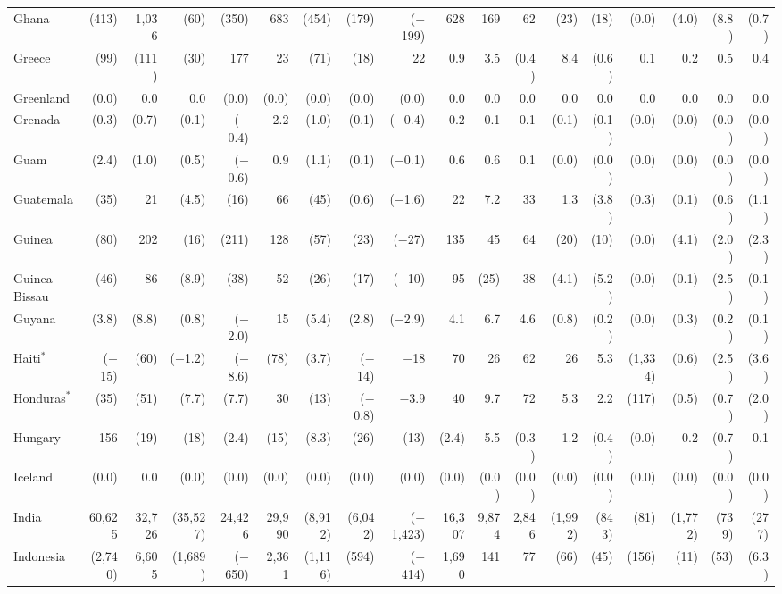 \begin{longtable}{lrrrrrrrrrrrrrrrrr}
Ghana & (413) & 1,036 & (60) & (350) & 683 & (454) & (179) & ($-$199) & 628 & 169 & 62 & (23) & (18) & (0.0) & (4.0) & (8.8) & (0.7) \\
Greece & (99) & (111) & (30) & 177 & 23 & (71) & (18) & 22 & 0.9 & 3.5 & (0.4) & 8.4 & (0.6) & 0.1 & 0.2 & 0.5 & 0.4 \\
Greenland & (0.0) & 0.0 & 0.0 & (0.0) & (0.0) & (0.0) & (0.0) & (0.0) & 0.0 & 0.0 & 0.0 & 0.0 & 0.0 & 0.0 & 0.0 & 0.0 & 0.0 \\
Grenada & (0.3) & (0.7) & (0.1) & ($-$0.4) & 2.2 & (1.0) & (0.1) & ($-$0.4) & 0.2 & 0.1 & 0.1 & (0.1) & (0.1) & (0.0) & (0.0) & (0.0) & (0.0) \\
Guam & (2.4) & (1.0) & (0.5) & ($-$0.6) & 0.9 & (1.1) & (0.1) & ($-$0.1) & 0.6 & 0.6 & 0.1 & (0.0) & (0.0) & (0.0) & (0.0) & (0.0) & (0.0) \\
Guatemala & (35) & 21 & (4.5) & (16) & 66 & (45) & (0.6) & ($-$1.6) & 22 & 7.2 & 33 & 1.3 & (3.8) & (0.3) & (0.1) & (0.6) & (1.1) \\
Guinea & (80) & 202 & (16) & (211) & 128 & (57) & (23) & ($-$27) & 135 & 45 & 64 & (20) & (10) & (0.0) & (4.1) & (2.0) & (2.3) \\
Guinea-Bissau & (46) & 86 & (8.9) & (38) & 52 & (26) & (17) & ($-$10) & 95 & (25) & 38 & (4.1) & (5.2) & (0.0) & (0.1) & (2.5) & (0.1) \\
Guyana & (3.8) & (8.8) & (0.8) & ($-$2.0) & 15 & (5.4) & (2.8) & ($-$2.9) & 4.1 & 6.7 & 4.6 & (0.8) & (0.2) & (0.0) & (0.3) & (0.2) & (0.1) \\
Haiti$^{*}$ & ($-$15) & (60) & ($-$1.2) & ($-$8.6) & (78) & (3.7) & ($-$14) & $-$18 & 70 & 26 & 62 & 26 & 5.3 & (1,334) & (0.6) & (2.5) & (3.6) \\
Honduras$^{*}$ & (35) & (51) & (7.7) & (7.7) & 30 & (13) & ($-$0.8) & $-$3.9 & 40 & 9.7 & 72 & 5.3 & 2.2 & (117) & (0.5) & (0.7) & (2.0) \\
Hungary & 156 & (19) & (18) & (2.4) & (15) & (8.3) & (26) & (13) & (2.4) & 5.5 & (0.3) & 1.2 & (0.4) & (0.0) & 0.2 & (0.7) & 0.1 \\
Iceland & (0.0) & 0.0 & (0.0) & (0.0) & (0.0) & (0.0) & (0.0) & (0.0) & (0.0) & (0.0) & (0.0) & (0.0) & (0.0) & (0.0) & (0.0) & (0.0) & (0.0) \\
India & 60,625 & 32,726 & (35,527) & 24,426 & 29,990 & (8,912) & (6,042) & ($-$1,423) & 16,307 & 9,874 & 2,846 & (1,992) & (843) & (81) & (1,772) & (739) & (277) \\
Indonesia & (2,740) & 6,605 & (1,689) & ($-$650) & 2,361 & (1,116) & (594) & ($-$414) & 1,690 & 141 & 77 & (66) & (45) & (156) & (11) & (53) & (6.3) \\

\end{longtable}
